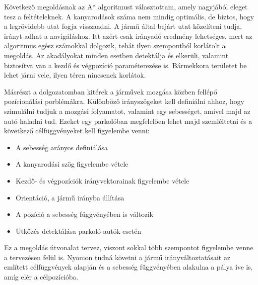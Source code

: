 Következő megoldásnak az A* algoritmust választottam, amely nagyjából eleget tesz a feltételeknek. A kanyarodások száma nem mindig optimális, de biztos, hogy a legrövidebb utat fogja visszaadni. A jármű által bejárt utat közelíteni tudja, irányt adhat a navigáláshoz. Itt azért csak irányadó eredmény lehetséges, mert az algoritmus egész számokkal dolgozik, tehát ilyen szempontból korlátolt a megoldás. Az akadályokat minden esetben detektálja és elkerüli, valamint biztosítva van a kezdő és végpozíció paraméterezése is. Bármekkora területet be lehet járni vele, ilyen téren nincsenek korlátok.  


Másrészt a dolgozatomban kitérek a járművek mozgása közben fellépő pozícionálási porblémákra. Különböző irányszögeket kell definiálni ahhoz, hogy szimulálni tudjuk a mozgási folyamatot, valamint egy sebességet, amivel majd az autó haladni tud. Ezeket egy parkolóban megfelelően lehet majd szemléltetni és a következő célfüggvényeket kell figyelembe venni:
\begin{itemize}
	\item A sebesség arányos definiálása
	\item A kanyarodási szög figyelembe vétele
	\item Kezdő- és végpozíciók irányvektorainak figyelembe vétele
	\item Orientáció, a jármű irányba állítása
	\item A pozíció a sebesség függvényében is változik
	\item Ütközés detektálása parkoló autók esetén
\end{itemize}

Ez a megoldás útvonalat tervez, viszont sokkal több szempontot figyelembe venne a tervezésen felül is. Nyomon tudná követni a jármű irányváltoztatásait az említett célfüggvények alapján és a sebesség függvényében alakulna a pálya íve is, amíg elér a célpozícióba.




